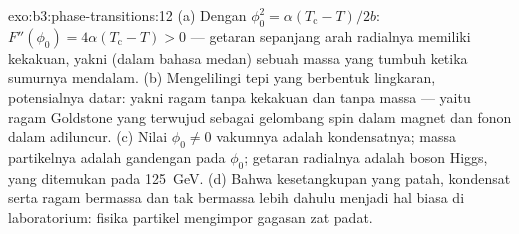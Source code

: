 \begin{solution}{exo:b3:phase-transitions:12}
(a) Dengan $\phi_0^2 = \alpha(T_{\text{c}} - T)/2b$: $F''(\phi_0) =
4\alpha(T_{\text{c}} - T) > 0$ --- getaran sepanjang arah radialnya
memiliki kekakuan, yakni (dalam bahasa medan) sebuah massa yang
tumbuh ketika sumurnya mendalam. (b) Mengelilingi tepi yang berbentuk
lingkaran, potensialnya datar: yakni ragam tanpa kekakuan dan tanpa
massa --- yaitu ragam Goldstone yang terwujud sebagai gelombang spin
dalam magnet dan fonon dalam adiluncur. (c) Nilai $\phi_0 \neq 0$
vakumnya adalah kondensatnya; massa partikelnya adalah gandengan pada
$\phi_0$; getaran radialnya adalah boson Higgs, yang ditemukan pada
\qty{125}{GeV}. (d) Bahwa kesetangkupan yang patah, kondensat serta ragam
bermassa dan tak bermassa lebih dahulu menjadi hal biasa di laboratorium:
fisika partikel mengimpor gagasan zat padat.
\end{solution}

